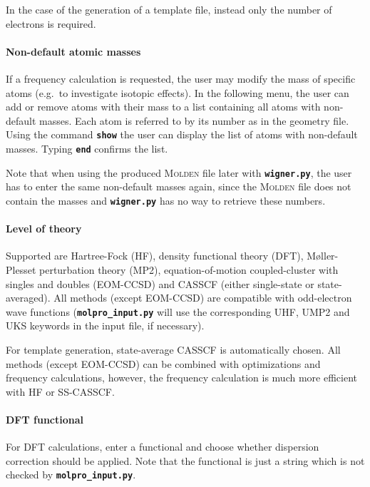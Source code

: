 \documentclass[a4paper,10pt,DIV=15,openany]{scrbook}
\newcommand{\ttt}[1]{\textbf{\texttt{#1}}}
\begin{document}
In the case of the generation of a template file, instead only the number of electrons is required.

\paragraph{Non-default atomic masses}

If a frequency calculation is requested, the user may modify the mass of specific atoms (e.g.\ to investigate isotopic effects). In the following menu, the user can add or remove atoms with their mass to a list containing all atoms with non-default masses. Each atom is referred to by its number as in the geometry file. Using the command \ttt{show} the user can display the list of atoms with non-default masses. Typing \ttt{end} confirms the list.

Note that when using the produced \textsc{Molden} file later with \ttt{wigner.py}, the user has to enter the same non-default masses again, since the \textsc{Molden} file does not contain the masses and \ttt{wigner.py} has no way to retrieve these numbers.

\paragraph{Level of theory}

Supported are Hartree-Fock (HF), density functional theory (DFT), M{\o}ller-Plesset perturbation theory (MP2), equation-of-motion coupled-cluster with singles and doubles (EOM-CCSD) and CASSCF (either single-state or state-averaged). All methods (except EOM-CCSD) are compatible with odd-electron wave functions (\ttt{molpro\_input.py} will use the corresponding UHF, UMP2 and UKS keywords in the input file, if necessary).

For template generation, state-average CASSCF is automatically chosen. All methods (except EOM-CCSD) can be combined with optimizations and frequency calculations, however, the frequency calculation is much more efficient with HF or SS-CASSCF. 

\paragraph{DFT functional}

For DFT calculations, enter a functional and choose whether dispersion correction should be applied. Note that the functional is just a string which is not checked by \ttt{molpro\_input.py}. 
\end{document}
